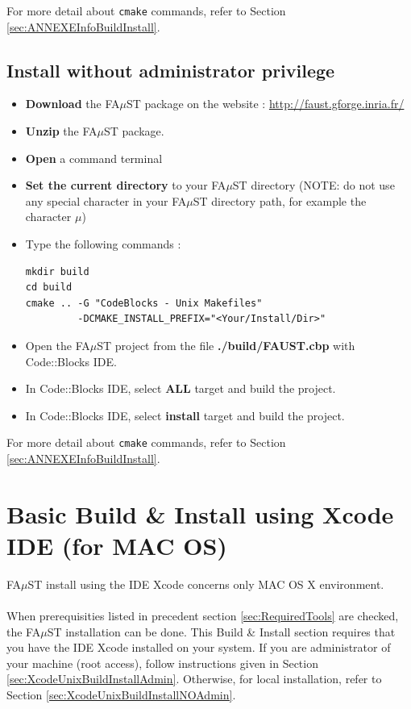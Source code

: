\begin{itemize}
For more detail about \texttt{cmake} commands, refer to Section \ref{sec:ANNEXEInfoBuildInstall}.


\subsection{Install without administrator privilege}\label{sec:CodeBlocUnixBuildInstallNOAdmin}
\begin{itemize}
\item \textbf{Download} the FA$\mu$ST package on the website :  \url{http://faust.gforge.inria.fr/}
\item \textbf{Unzip} the FA$\mu$ST package.
\item \textbf{Open} a command terminal
\item \textbf{Set the current directory} to your FA$\mu$ST directory (NOTE: do not use any special character in your FA$\mu$ST directory path, for example the character $\mu$)
\item Type the following commands : 
\begin{lstlisting}
mkdir build
cd build
cmake .. -G "CodeBlocks - Unix Makefiles"
		 -DCMAKE_INSTALL_PREFIX="<Your/Install/Dir>"
\end{lstlisting}

\item Open the FA$\mu$ST project from the file \textbf{./build/FAUST.cbp} with Code::Blocks IDE. 
\item In Code::Blocks IDE, select \textbf{ALL} target and build the project. 
\item In Code::Blocks IDE, select \textbf{install} target and build the project. 
\end{itemize}

For more detail about \texttt{cmake} commands, refer to Section \ref{sec:ANNEXEInfoBuildInstall}.


\section{Basic Build \& Install using Xcode IDE (for MAC OS)}\label{sec:MacInstallXcode}

FA$\mu$ST install using the IDE Xcode concerns only MAC OS X environment.
\paragraph{}When prerequisities listed in precedent section \ref{sec:RequiredTools} are checked, the FA$\mu$ST installation can be done. This Build \& Install section requires that you have the IDE Xcode installed on your system. If you are administrator of your machine (root access), follow instructions given in Section \ref{sec:XcodeUnixBuildInstallAdmin}. Otherwise, for local installation, refer to Section \ref{sec:XcodeUnixBuildInstallNOAdmin}. 


\end{itemize}
